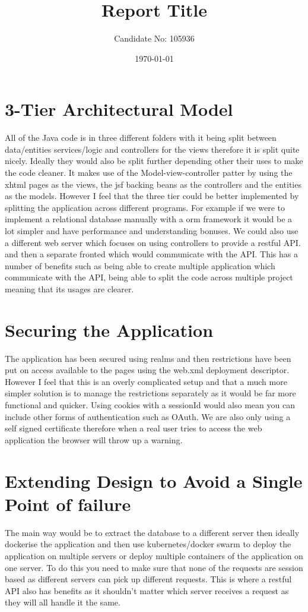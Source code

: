 \documentclass[a4paper,12pt]{scrartcl}
\title{Report Title}
\author{Candidate No: 105936}
\date{\today}
\begin{document}
	
	\begin{titlepage}
		\maketitle
	\end{titlepage}
	
	\tableofcontents
	\newpage
	\section{3-Tier Architectural Model}
	{
		All of the Java code is in three different folders with it being split between data/entities services/logic and controllers for the views therefore it is split quite nicely. Ideally they would also be split further depending other their uses to make the code cleaner. It makes use of the Model-view-controller patter by using the xhtml pages as the views, the jsf backing beans as the controllers and the entities as the models. However I feel that the three tier could be better implemented by splitting the application across different programs. For example if we were to implement a relational database manually with a orm framework it would be a lot simpler and have performance and understanding bonuses. We could also use a different web server which focuses on using controllers to provide a restful API. and then a separate fronted which would communicate with the API. This has a number of benefits such as being able to create multiple application which communicate with the API, being able to split the code across multiple project meaning that its usages are clearer.
	}
	\section{Securing the Application}
	{
		The application has been secured using realms and then restrictions have been put on access available to the pages using the web.xml deployment descriptor. However I feel that this is an overly complicated setup and that a much more simpler solution is to manage the restrictions separately as it would be far more functional and quicker. Using cookies with a sessionId would also mean you can include other forms of authentication such as OAuth. We are also only using a self signed certificate therefore when a real user tries to access the web application the browser will throw up a warning.
	}
	\section{Extending Design to Avoid a Single Point of failure}
	{
		The main way would be to extract the database to a different server then ideally dockerise the application and then use kubernetes/docker swarm to deploy the application on multiple servers or deploy multiple containers of the application on one server. To do this you need to make sure that none of the requests are session based as different servers can pick up different requests. This is where a restful API also has benefits as it shouldn't matter which server receives a request as they will all handle it the same. 
	}
\end{document}
